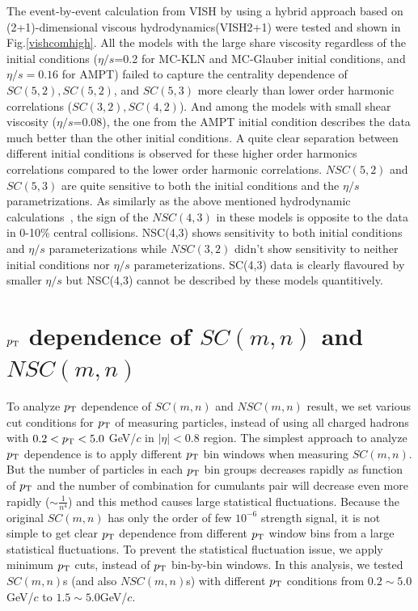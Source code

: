   The event-by-event calculation from VISH by using a hybrid approach based on (2+1)-dimensional viscous hydrodynamics(VISH2+1) were tested and shown in Fig.\ref{vishcomhigh}. All the models with the large share viscosity regardless of the initial conditions ($\eta/s$=0.2 for MC-KLN and MC-Glauber initial conditions, and $\eta/s = 0.16$ for AMPT) failed to capture the centrality dependence of $SC(5,2), SC(5,2)$, and $SC(5,3)$ more clearly than lower order harmonic correlations ($SC(3,2), SC(4,2)$).
And among the models with small shear viscosity ($\eta/s$=0.08), the one from the AMPT initial condition describes the data much better than the other initial conditions. 
A quite clear separation between different initial conditions is observed for these higher order harmonics correlations compared to the lower order harmonic correlations.
$NSC(5,2)$ and $SC(5,3)$ are quite sensitive to both the initial conditions and the $\eta/s$ parametrizations.
As similarly as the above mentioned hydrodynamic calculations~\cite{Niemi:2015qia}, the sign of the $NSC(4,3)$ in these models is opposite to the data in 0-10\% central collisions. NSC(4,3) shows sensitivity to both initial conditions and $\eta/s$ parameterizations while $NSC(3,2)$ didn't show sensitivity to neither initial conditions nor $\eta/s$ parameterizations.
SC(4,3) data is clearly flavoured by smaller $\eta/s$ but NSC(4,3) cannot be described by these models quantitively.






\section{$p_{\rm{T}}$ dependence of $SC(m,n)$ and  $NSC(m,n)$}

To analyze $p_{\rm{T}}$ dependence of $SC(m,n)$ and  $NSC(m,n)$ result, we set various cut conditions for $p_{\rm{T}}$ of measuring particles, instead of using all charged hadrons with $0.2 < p_{\rm{T}} < 5.0$ GeV/$c$ in $|\eta|<0.8$ region. The simplest approach to analyze $p_{\rm{T}}$ dependence is to apply different $p_{\rm{T}}$ bin windows when measuring $SC(m,n)$. But the number of particles in each $p_{\rm{T}}$ bin groups decreases rapidly as function of $p_{\rm{T}}$ and the number of combination for cumulants pair will decrease even more rapidly ($ \sim\frac{1}{n^4}$) and this method causes large statistical fluctuations. Because the original $SC(m,n)$ has only the order of few $10^{-6}$ strength signal, it is not simple to get clear $p_{\rm{T}}$ dependence from different $p_{\rm{T}}$ window bins from a large statistical fluctuations. To prevent the statistical fluctuation issue, we apply minimum $p_{\rm{T}}$ cuts, instead of $p_{\rm{T}}$ bin-by-bin windows. In this analysis, we tested $SC(m,n)$s (and also $NSC(m,n)$s) with different $p_{\rm{T}}$ conditions from $0.2 \sim 5.0$GeV/$c$ to $1.5 \sim 5.0$GeV/$c$. 

